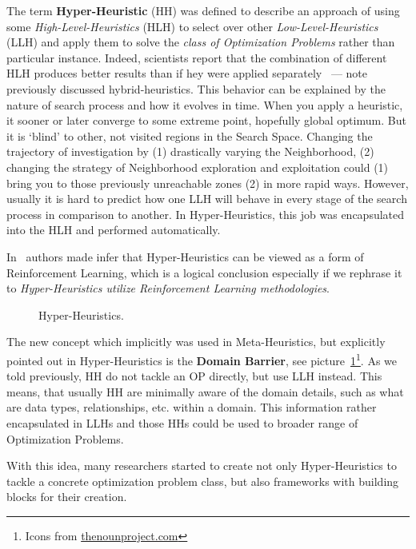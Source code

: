 The term \textbf{Hyper-Heuristic} (HH) was defined to describe an approach of using some \textit{High-Level-Heuristics} (HLH) to select over other \textit{Low-Level-Heuristics} (LLH) and apply them to solve the \textit{class of Optimization Problems} rather than particular instance. Indeed, scientists report that the combination of different HLH produces better results than if hey were applied separately~\cite{drake2019recent} — note previously discussed hybrid-heuristics.
This behavior can be explained by the nature of search process and how it evolves in time. When you apply a heuristic, it sooner or later converge to some extreme point, hopefully global optimum. But it is `blind' to other, not visited regions in the Search Space. Changing the trajectory of investigation by (1) drastically varying the Neighborhood, (2) changing the strategy of Neighborhood exploration and exploitation could (1) bring you to those previously unreachable zones (2) in more rapid ways. However, usually it is hard to predict how one LLH will behave in every stage of the search process in comparison to another. In Hyper-Heuristics, this job was encapsulated into the HLH and performed automatically. 

In~\cite{moriarty1999evolutionary} authors made infer that Hyper-Heuristics can be viewed as a form of Reinforcement Learning, which is a logical conclusion especially if we rephrase it to \textit{Hyper-Heuristics utilize Reinforcement Learning methodologies}.

\begin{figure}
	\centering
	
	\caption[Hyper-Heuristics]{Hyper-Heuristics.}
	\label{bg:pic:HH}
\end{figure}

The new concept which implicitly was used in Meta-Heuristics, but explicitly pointed out in Hyper-Heuristics is the \textbf{Domain Barrier}, see picture~\ref{bg:pic:HH}\footnote{Icons from \href{https://thenounproject.com/}{thenounproject.com}}.
As we told previously, HH do not tackle an OP directly, but use LLH instead. This means, that usually HH are minimally aware of the domain details, such as what are data types, relationships, etc. within a domain. This information rather encapsulated in LLHs and those HHs could be used to broader range of Optimization Problems.

With this idea, many researchers started to create not only Hyper-Heuristics to tackle a concrete optimization problem class, but also frameworks with building blocks for their creation.


